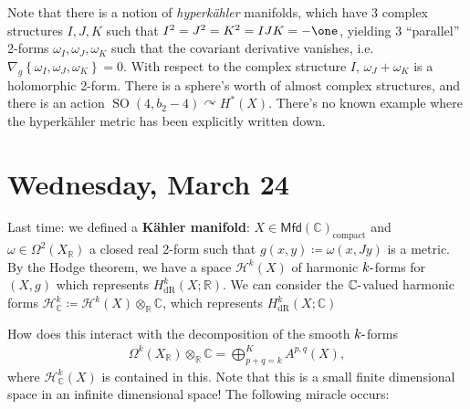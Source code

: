 \begin{remark}

Note that there is a notion of \emph{hyperkähler} manifolds, which have
3 complex structures \(I, J, K\) such that
\(I^2=J^2=K^2 = IJK = -\one\), yielding 3 ``parallel'' 2-forms
\(\omega_I, \omega_J, \omega_K\) such that the covariant derivative
vanishes,
i.e.~\(\nabla_g \left\{{ \omega_I, \omega_J, \omega_K }\right\} = 0\).
With respect to the complex structure \(I\), \(\omega_J + \omega_K\) is
a holomorphic 2-form. There is a sphere's worth of almost complex
structures, and there is an action
\({\operatorname{SO}}(4, b_2 - 4) \curvearrowright H^*(X)\). There's no
known example where the hyperkähler metric has been explicitly written
down.

\end{remark}

\hypertarget{wednesday-march-24}{%
\section{Wednesday, March 24}\label{wednesday-march-24}}

\begin{remark}

Last time: we defined a \textbf{Kähler manifold}:
\(X\in {\mathsf{Mfd}}({\mathbb{C}})_{ \text{compact} }\) and
\(\omega \in \Omega^2(X_{\mathbb{R}})\) a closed real 2-form such that
\(g(x, y) \coloneqq\omega(x, Jy)\) is a metric. By the Hodge theorem, we
have a space \({\mathcal{H}}^k(X)\) of harmonic \(k{\hbox{-}}\)forms for
\((X, g)\) which represents \(H^k_{\mathrm{dR}}(X; {\mathbb{R}})\). We
can consider the \({\mathbb{C}}{\hbox{-}}\)valued harmonic forms
\({\mathcal{H}}^k_{\mathbb{C}}\coloneqq{\mathcal{H}}^k(X) \otimes_{\mathbb{R}}{\mathbb{C}}\),
which represents \(H^k_\mathrm{dR}(X; {\mathbb{C}})\)

\end{remark}

\begin{question}

How does this interact with the decomposition of the smooth
\(k{\hbox{-}}\)forms
\begin{align*}
\Omega^k(X_{\mathbb{R}})\otimes_{\mathbb{R}}{\mathbb{C}}= \bigoplus_{p+q=k}^K A^{p, q}(X)
,\end{align*}
where \({\mathcal{H}}^k_{\mathbb{C}}(X)\) is contained in this. Note
that this is a small finite dimensional space in an infinite dimensional
space! The following miracle occurs:

\end{question}

